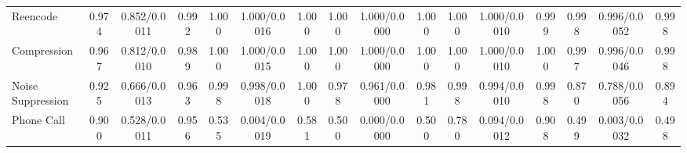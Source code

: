 \begin{table}[t]
{\begin{tabular}{l ccc ccc ccc ccc ccc}
Reencode
& 0.974 & 0.852/0.0011 & 0.992
& 1.000 & 1.000/0.0016 & 1.000
& 1.000 & 1.000/0.0000 & 1.000
& 1.000 & 1.000/0.0010 & 0.999
& 0.998 & 0.996/0.0052 & 0.998 \\

Compression
& 0.967 & 0.812/0.0010 & 0.989
& 1.000 & 1.000/0.0015 & 1.000
& 1.000 & 1.000/0.0000 & 1.000
& 1.000 & 1.000/0.0010 & 1.000
& 0.997 & 0.996/0.0046 & 0.998 \\

Noise Suppression
& 0.925 & 0.666/0.0013 & 0.963
& 0.998 & 0.998/0.0018 & 1.000
& 0.978 & 0.961/0.0000 & 0.981
& 0.998 & 0.994/0.0010 & 0.998
& 0.870 & 0.788/0.0056 & 0.894 \\

Phone Call
& 0.900 & 0.528/0.0011 & 0.956
& 0.535 & 0.004/0.0019 & 0.581
& 0.500 & 0.000/0.0000 & 0.500
& 0.780 & 0.094/0.0012 & 0.908
& 0.499 & 0.003/0.0032 & 0.498 \\
\bottomrule
\end{tabular}
}
\end{table}
